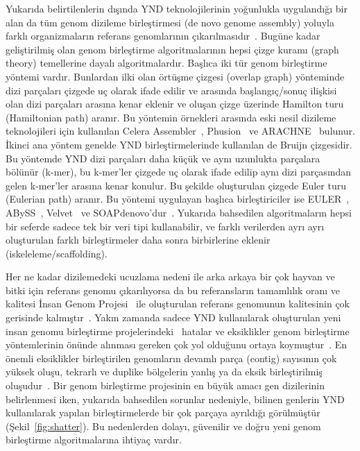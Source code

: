 \documentclass[11pt]{article}
\begin{document}
Yukarıda belirtilenlerin dışında YND teknolojilerinin yoğunlukla uygulandığı bir alan da tüm genom dizileme birleştirmesi (de novo genome assembly) yoluyla farklı organizmaların referans genomlarının çıkarılmasıdır~\cite{Schatz2010}. Bugüne kadar geliştirilmiş olan genom birleştirme algoritmalarının hepsi çizge kuramı (graph theory) temellerine dayalı algoritmalardır. Başlıca iki tür genom birleştirme yöntemi vardır. Bunlardan ilki olan örtüşme çizgesi (overlap graph) yönteminde dizi parçaları çizgede uç olarak ifade edilir ve arasında başlangıç/sonuç ilişkisi olan dizi parçaları arasına kenar eklenir ve oluşan çizge üzerinde Hamilton turu (Hamiltonian path) aranır. Bu yöntemin örnekleri arasında eski nesil dizileme teknolojileri için kullanılan Celera Assembler~\cite{Myers2002}, Phusion~\cite{Mullikin2003} ve ARACHNE~\cite{Batzoglou2002} bulunur. İkinci ana yöntem genelde YND birleştirmelerinde kullanılan de Bruijn çizgesidir. Bu yöntemde YND dizi parçaları daha küçük ve aynı uzunlukta parçalara bölünür (k-mer), bu k-mer'ler çizgede uç olarak ifade edilip aynı dizi parçasından gelen k-mer'ler arasına kenar konulur. Bu şekilde oluşturulan çizgede Euler turu (Eulerian path) aranır. Bu yöntemi uygulayan başlıca birleştiriciler ise EULER~\cite{Chaisson2009}, ABySS~\cite{Simpson2009}, Velvet~\cite{Zerbino2008} ve SOAPdenovo'dur~\cite{Li2010b}. Yukarıda bahsedilen algoritmaların hepsi bir seferde sadece tek bir veri tipi kullanabilir, ve farklı verilerden ayrı ayrı oluşturulan farklı birleştirmeler daha sonra birbirlerine eklenir (iskeleleme/scaffolding).

Her ne kadar dizilemedeki ucuzlama nedeni ile arka arkaya bir çok hayvan ve bitki için referans genomu çıkarılıyorsa da bu referansların tamamlılık oranı ve kalitesi İnsan Genom Projesi~\cite{IHGSC2001} ile oluşturulan referans genomunun kalitesinin çok gerisinde kalmıştır~\cite{Schatz2010,Alkan2011c}. Yakın zamanda sadece YND kullanılarak oluşturulan yeni insan genomu birleştirme projelerindeki~\cite{Li2010b,Gnerre2011} hatalar ve eksiklikler genom birleştirme yöntemlerinin önünde alınması gereken çok yol olduğunu ortaya koymuştur~\cite{Alkan2011c}. En önemli eksiklikler birleştirilen genomların devamlı parça (contig) sayısının çok yüksek oluşu, tekrarlı ve duplike bölgelerin yanlış ya da eksik birleştirilmiş oluşudur~\cite{Alkan2011c}. Bir genom birleştirme projesinin en büyük amacı gen dizilerinin belirlenmesi iken, yukarıda bahsedilen sorunlar nedeniyle, bilinen genlerin YND kullanılarak yapılan birleştirmelerde bir çok parçaya ayrıldığı görülmüştür (Şekil~\ref{fig:shatter}). Bu nedenlerden dolayı, güvenilir ve doğru yeni genom birleştirme algoritmalarına ihtiyaç vardır.
\end{document}
